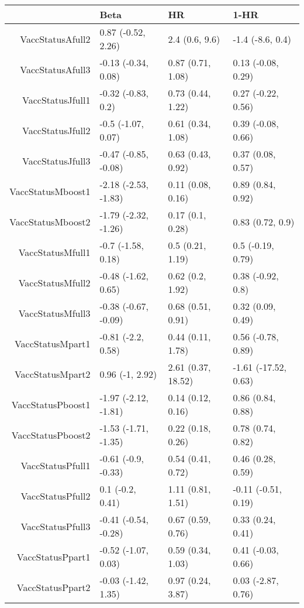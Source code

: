 \begin{table}[ht]
\centering
\begin{tabular}{rlll}
  \hline
 & Beta & HR & 1-HR \\ 
  \hline
VaccStatusAfull2 & 0.87 (-0.52, 2.26) & 2.4 (0.6, 9.6) & -1.4 (-8.6, 0.4) \\ 
  VaccStatusAfull3 & -0.13 (-0.34, 0.08) & 0.87 (0.71, 1.08) & 0.13 (-0.08, 0.29) \\ 
  VaccStatusJfull1 & -0.32 (-0.83, 0.2) & 0.73 (0.44, 1.22) & 0.27 (-0.22, 0.56) \\ 
  VaccStatusJfull2 & -0.5 (-1.07, 0.07) & 0.61 (0.34, 1.08) & 0.39 (-0.08, 0.66) \\ 
  VaccStatusJfull3 & -0.47 (-0.85, -0.08) & 0.63 (0.43, 0.92) & 0.37 (0.08, 0.57) \\ 
  VaccStatusMboost1 & -2.18 (-2.53, -1.83) & 0.11 (0.08, 0.16) & 0.89 (0.84, 0.92) \\ 
  VaccStatusMboost2 & -1.79 (-2.32, -1.26) & 0.17 (0.1, 0.28) & 0.83 (0.72, 0.9) \\ 
  VaccStatusMfull1 & -0.7 (-1.58, 0.18) & 0.5 (0.21, 1.19) & 0.5 (-0.19, 0.79) \\ 
  VaccStatusMfull2 & -0.48 (-1.62, 0.65) & 0.62 (0.2, 1.92) & 0.38 (-0.92, 0.8) \\ 
  VaccStatusMfull3 & -0.38 (-0.67, -0.09) & 0.68 (0.51, 0.91) & 0.32 (0.09, 0.49) \\ 
  VaccStatusMpart1 & -0.81 (-2.2, 0.58) & 0.44 (0.11, 1.78) & 0.56 (-0.78, 0.89) \\ 
  VaccStatusMpart2 & 0.96 (-1, 2.92) & 2.61 (0.37, 18.52) & -1.61 (-17.52, 0.63) \\ 
  VaccStatusPboost1 & -1.97 (-2.12, -1.81) & 0.14 (0.12, 0.16) & 0.86 (0.84, 0.88) \\ 
  VaccStatusPboost2 & -1.53 (-1.71, -1.35) & 0.22 (0.18, 0.26) & 0.78 (0.74, 0.82) \\ 
  VaccStatusPfull1 & -0.61 (-0.9, -0.33) & 0.54 (0.41, 0.72) & 0.46 (0.28, 0.59) \\ 
  VaccStatusPfull2 & 0.1 (-0.2, 0.41) & 1.11 (0.81, 1.51) & -0.11 (-0.51, 0.19) \\ 
  VaccStatusPfull3 & -0.41 (-0.54, -0.28) & 0.67 (0.59, 0.76) & 0.33 (0.24, 0.41) \\ 
  VaccStatusPpart1 & -0.52 (-1.07, 0.03) & 0.59 (0.34, 1.03) & 0.41 (-0.03, 0.66) \\ 
  VaccStatusPpart2 & -0.03 (-1.42, 1.35) & 0.97 (0.24, 3.87) & 0.03 (-2.87, 0.76) \\ 

\end{tabular}
\end{table}
